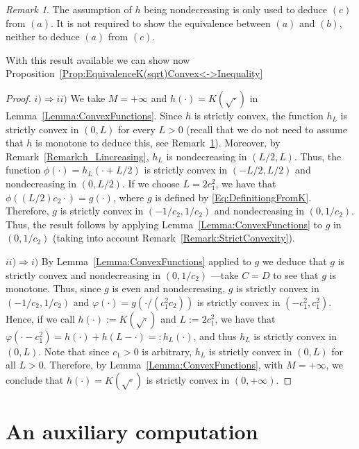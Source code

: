 \documentclass[12pt,reqno]{amsart}
\theoremstyle{definition}
\theoremstyle{remark}
\newtheorem{remark}[theorem]{Remark}
\numberwithin{equation}{section}
\begin{document}
	\begin{remark}
		\label{Remark:hypothesisNondecreasing}
		The assumption of $h$ being nondecreasing is only used to deduce $(c)$ from $(a)$. It is not required to show the equivalence between $(a)$ and $(b)$, neither to deduce $(a)$ from $(c)$.
	\end{remark}
	
	With this result available we can show now Proposition~\ref{Prop:EquivalenceK(sqrt)Convex<->Inequality}
	
	\begin{proof}
		$i) \Rightarrow ii)$ We take $M = +\infty$ and $h(\cdot) = K(\sqrt{\cdot})$ in Lemma~\ref{Lemma:ConvexFunctions}. Since $h$ is strictly convex, the function $h_L$ is strictly convex in $(0,L)$ for every $L> 0$ (recall that we do not need to assume that $h$ is monotone to deduce this, see Remark~\ref{Remark:hypothesisNondecreasing}). Moreover, by Remark~\ref{Remark:h_Lincreasing}, $h_L$ is nondecreasing in $(L/2,L)$. Thus, the function $\phi(\cdot) = h_L(\cdot + L/2)$ is strictly convex in $(-L/2,L/2)$ and nondecreasing in $(0,L/2)$. If we choose $L=2c_1^2$, we have that $\phi((L/2)c_2 \cdot) = g(\cdot)$, where $g$ is defined by \eqref{Eq:DefinitiongFromK}. Therefore, $g$ is strictly convex in $(-1/c_2, 1/c_2)$ and nondecreasing in $(0,1/c_2)$. Thus, the result follows by applying  Lemma~\ref{Lemma:ConvexFunctions} to $g$ in $(0,1/c_2)$ (taking into account Remark~\ref{Remark:StrictConvexity}).
		
		
		$ii) \Rightarrow i)$ By Lemma~\ref{Lemma:ConvexFunctions} applied to $g$ we deduce that $g$ is strictly convex and nondecreasing in $(0,1/c_2)$ ---take $C=D$ to see that $g$ is monotone. Thus, since $g$ is even and nondecreasing, $g$ is strictly convex in $(-1/c_2,1/c_2)$ and $\varphi(\cdot) = g(\cdot/(c_1^2 c_2))$ is strictly convex in $(-c_1^2, c_1^2)$. Hence, if we call $h(\cdot) := K(\sqrt{\cdot})$ and $L:= 2c_1^2$, we have that $\varphi(\cdot - c_1^2) = h(\cdot) + h(L-\cdot) =:  h_L(\cdot)$, and thus $h_L$ is strictly convex in $(0,L)$. Note that since $c_1>0$ is arbitrary, $h_L$ is strictly convex in $(0,L)$ for all $L>0$. Therefore, by Lemma~\ref{Lemma:ConvexFunctions}, with  $M = +\infty$, we conclude that $h(\cdot) = K(\sqrt{\cdot})$ is strictly convex in $(0,+\infty)$.
	\end{proof}
	
	
	\section{An auxiliary computation}
	\label{Sec:AuxiliaryResults2}
	
\end{document}
